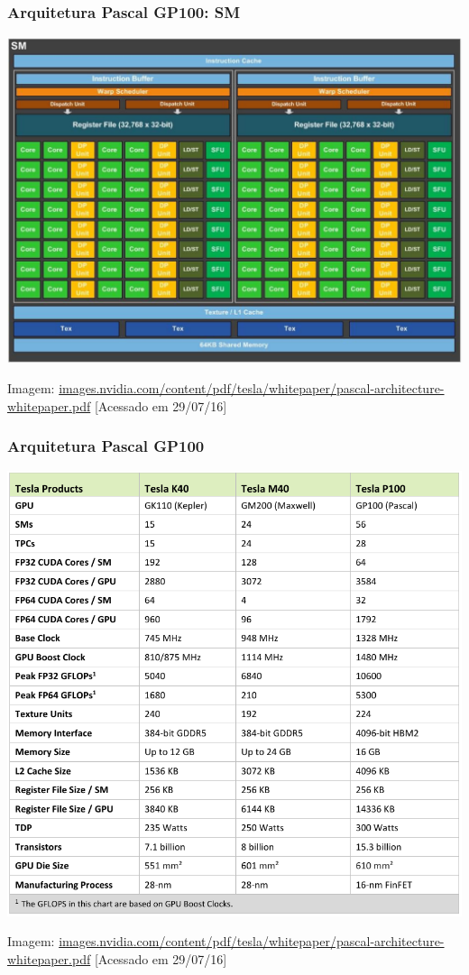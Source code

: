 \documentclass[10pt, compress]{beamer}
\begin{document}
\begin{frame}
    \frametitle{Arquitetura Pascal GP100: SM}
    \centering
    \includegraphics[width=.9\textwidth]{gp100_SM_diagram}
    \hfill

    \tiny{Imagem: \url{images.nvidia.com/content/pdf/tesla/whitepaper/pascal-architecture-whitepaper.pdf} [Acessado em 29/07/16]}
\end{frame}

\begin{frame}
    \frametitle{Arquitetura Pascal GP100}
    \centering
    \includegraphics[width=.7\textwidth]{gp100_stats}
    \hfill

    \tiny{Imagem: \url{images.nvidia.com/content/pdf/tesla/whitepaper/pascal-architecture-whitepaper.pdf} [Acessado em 29/07/16]}
\end{frame}
\end{document}
